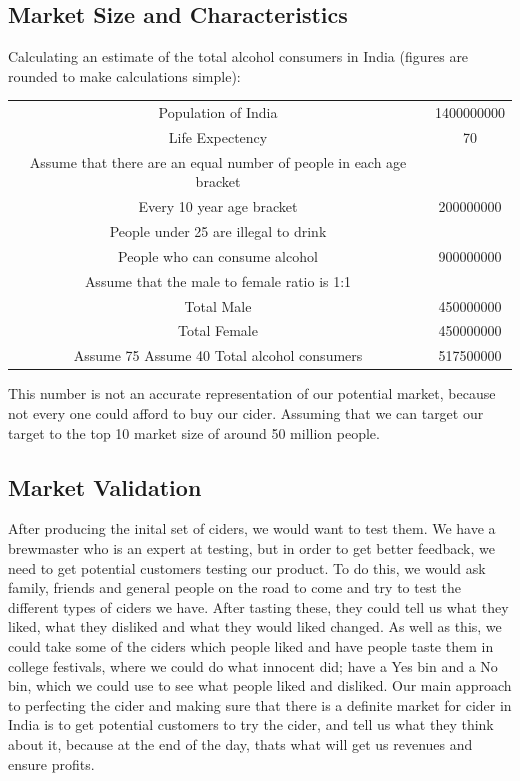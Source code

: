 \documentclass[11pt]{article}
\begin{document}
  \subsection{Market Size and Characteristics}
		Calculating an estimate of the total alcohol consumers in India (figures are rounded to make calculations simple):
		\begin{center}
			\begin{tabular}{ | c | c | }
				Population of India & 1400000000 \\
				Life Expectency & 70 \\
				Assume that there are an equal number of people in each age bracket & \\
				Every 10 year age bracket & 200000000 \\
				People under 25 are illegal to drink & \\
				People who can consume alcohol & 900000000 \\
				Assume that the male to female ratio is 1:1 & \\
				Total Male & 450000000 \\
				Total Female & 450000000 \\
				Assume 75%
				Assume 40%
				Total alcohol consumers & 517500000 \\
			\end{tabular}
		\end{center}

		This number is not an accurate representation of our potential market,
		because not every one could afford to buy our cider. Assuming that
		we can target our target to the top 10%
		market size of around 50 million people.

  \subsection{Market Validation}
  After producing the inital set of ciders, we would want to test them. We have
  a brewmaster who is an expert at testing, but in order to get better feedback,
  we need to get potential customers testing our product. To do this, we would
  ask family, friends and general people on the road to come and try to test
  the different types of ciders we have. After tasting these, they could tell us
  what they liked, what they disliked and what they would liked changed.
  As well as this, we could take some of the ciders which people liked and have
  people taste them in college festivals, where we could do what innocent did;
  have a Yes bin and a No bin, which we could use to see what people liked and
  disliked.
  Our main approach to perfecting the cider and making sure that there is a
  definite market for cider in India is to get potential customers to try the cider,
  and tell us what they think about it, because at the end of the day, thats 
  what will get us revenues and ensure profits. 
\end{document}
